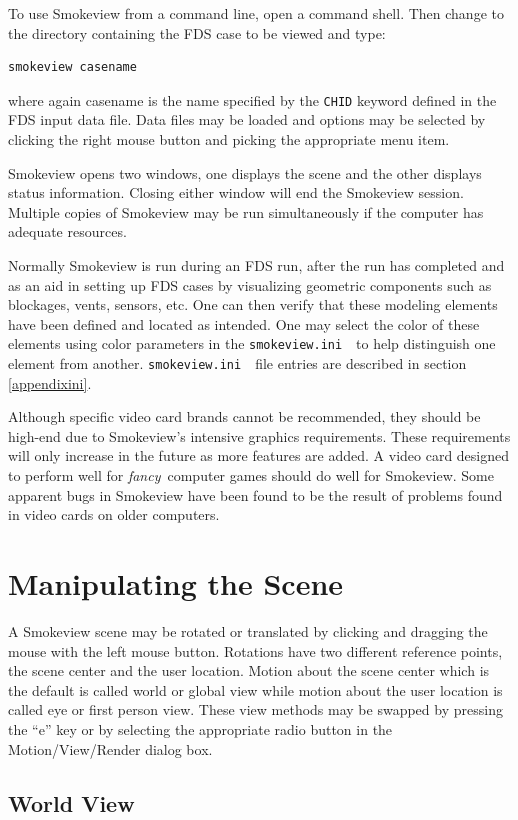 \documentclass[11pt,twoside]{book}
\newcommand{\svini}{{\tt smokeview.ini}\ }
\begin{document}
To use Smokeview from a command line, open a command shell. Then
change to the directory containing the FDS case to be viewed and
type:
\begin{lstlisting}
smokeview casename
\end{lstlisting}
where again casename is the name specified by the {\tt CHID}
keyword defined in the FDS input data file. Data files may be
loaded and options may be selected by clicking the right mouse
button and picking the appropriate menu item.


Smokeview opens two windows, one displays the scene and the other
displays status information. Closing either window will end the
Smokeview session.  Multiple copies of Smokeview may be run
simultaneously if the computer has adequate resources.

Normally Smokeview is run during an FDS run, after the run has
completed and as an aid in setting up FDS cases by visualizing
geometric components such as blockages, vents, sensors, etc. One
can then verify that these modeling elements have been defined and
located as intended. One may select the color of these elements
using color parameters in the \svini\ to help distinguish one
element from another. \svini\ file entries are described in
section \ref{appendixini}.

Although specific video card brands cannot be recommended, they
should be high-end due to Smokeview's intensive graphics
requirements. These requirements will only increase in the future
as more features are added.  A video card designed to perform well
for {\em fancy}\ computer games should do well for Smokeview. Some
apparent bugs in Smokeview have been found to be the result of
problems found in video cards on older computers.

\section{Manipulating the Scene}

A Smokeview scene may be rotated or translated by clicking and dragging the mouse with the left mouse button.
Rotations have two different reference
points, the scene center and the user location. Motion about the
scene center which is the default is called world or global view while motion about the
user location is called eye or first person view. These view
methods may be swapped by pressing the ``e'' key or by selecting
the appropriate radio button in the Motion/View/Render
dialog box.

\subsection{World View}
\end{document}
